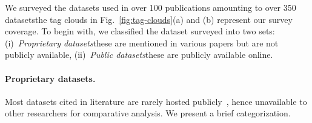 We surveyed the datasets used in over
100 publications amounting to over 350 datasets\textemdash{}the tag clouds
in Fig.~\ref{fig:tag-clouds}(a) and (b) represent our survey coverage.
To begin with, we classified the dataset surveyed into
two sets: 
(i)~\textit{Proprietary datasets}\textemdash{}these are mentioned in various
papers but are not publicly available,
(ii)~\textit{Public datasets}\textemdash{}these are publicly available
online.

\paragraph{Proprietary datasets.}
Most datasets cited in literature are rarely hosted
publicly~\cite{generating-datasets}, hence unavailable to
other researchers for comparative analysis. 
We present a brief categorization.

